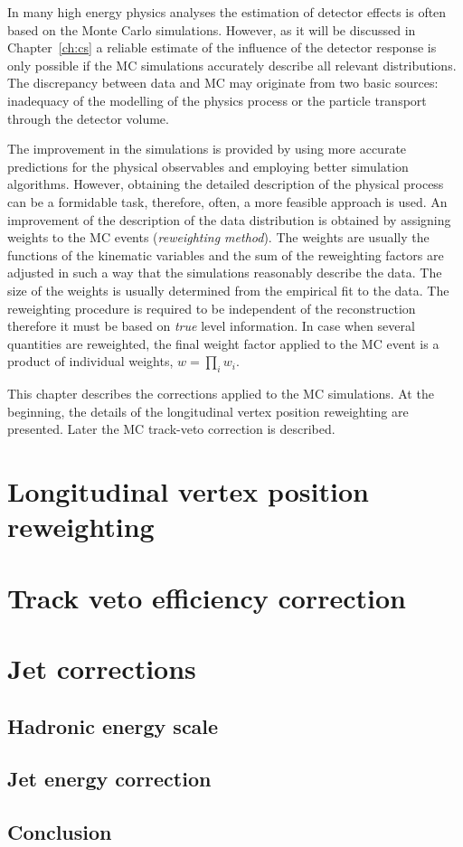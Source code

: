  In many high energy physics analyses the estimation of detector effects is often based on the Monte Carlo simulations. However, as it will be discussed in Chapter~\ref{ch:cs} a reliable estimate of the influence of the detector response is only possible if the MC simulations accurately describe all relevant distributions. %
 The discrepancy between data and MC may originate from two basic sources: inadequacy of the modelling of the physics process or the particle transport through the detector volume.
 
 The improvement in the simulations is provided by using more accurate predictions for the physical observables and employing better simulation algorithms. However, obtaining the detailed description of the physical process can be a formidable task, therefore, often, a more feasible approach is used. An improvement of the description of the data distribution is obtained by assigning weights to the MC events (\emph{reweighting method}). The weights are usually the functions of the kinematic variables and the sum of the reweighting factors are adjusted in such a way that the simulations reasonably describe the data. The size of the weights is usually determined from the empirical fit to the data. The reweighting procedure is required to be independent of the reconstruction therefore it must be based on \emph{true} level information. In case when several quantities are reweighted, the final weight factor applied to the MC event is a product of individual weights, $w = \prod_i w_i$.
 
 This chapter describes the corrections applied to the MC simulations. At the beginning, the details of the longitudinal vertex position reweighting are presented. Later the MC track-veto correction is described.

 \section{Longitudinal vertex position reweighting}
% 
 
 \section{Track veto efficiency correction}
% 

 \newpage
 \section{Jet corrections}
 \subsection{Hadronic energy scale}
 \subsection{Jet energy correction}
 
 \subsection{Conclusion}
%
